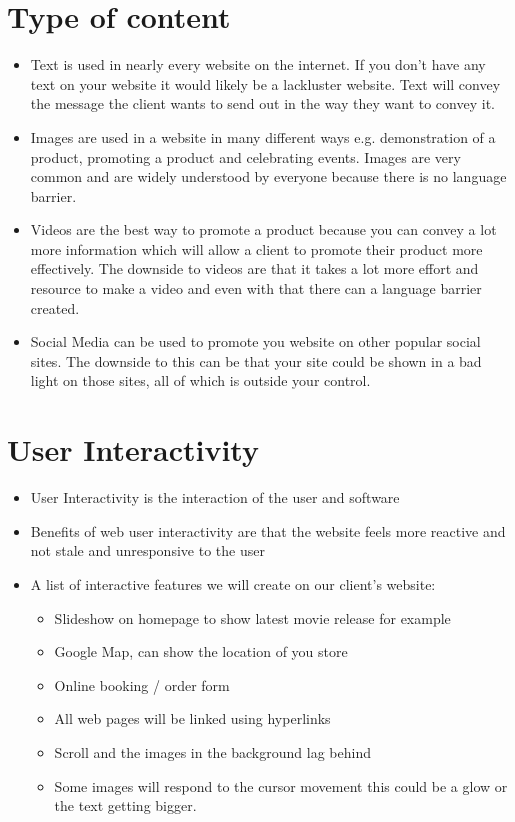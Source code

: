 \documentclass{article}
\begin{document}
\section{Type of content}
\begin{itemize}
    \item Text is used in nearly every website on the internet. If you don't have any text on your website it would likely be a lackluster website. Text will convey the message the client wants to send out in the way they want to convey it.
    \item Images are used in a website in many different ways e.g. demonstration of a product, promoting a product and celebrating events. Images are very common and are widely understood by everyone because there is no language barrier. 
    \item Videos are the best way to promote a product because you can convey a lot more information which will allow a client to promote their product more effectively. The downside to videos are that it takes a lot more effort and resource to make a video and even with that there can a language barrier created.
    \item Social Media can be used to promote you website on other popular social sites. The downside to this can be that your site could be shown in a bad light on those sites, all of which is outside your control. 
\end{itemize}

\section{User Interactivity}
\begin{itemize}
    \item User Interactivity is the interaction of the user and software
    \item Benefits of web user interactivity are that the website feels more reactive and not stale and unresponsive to the user 
    \item A list of interactive features we will create on our client's website:
    \begin{itemize}
        \item Slideshow on homepage to show latest movie release for example 
        \item Google Map, can show the location of you store
        \item Online booking / order form 
        \item All web pages will be linked using hyperlinks
        \item Scroll and the images in the background lag behind
        \item Some images will respond to the cursor movement this could be a glow or the text getting bigger.
    \end{itemize}
\end{itemize}
\end{document}

